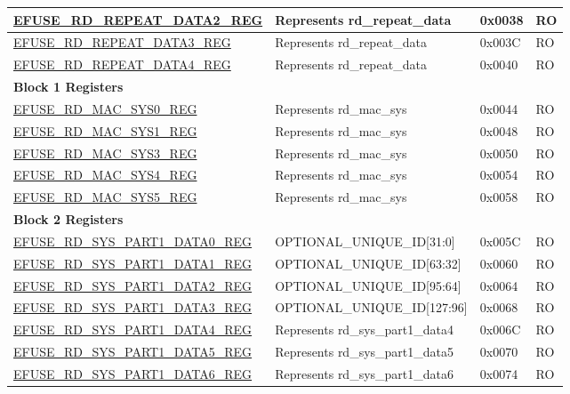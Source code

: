 \begin{longtable}{ | p{7cm} | p{6cm} | p{1.2cm} | p{1.5cm} | }
\hyperref[regdesc:EFUSERDREPEATDATA2REG]{EFUSE\_RD\_REPEAT\_DATA2\_REG} & Represents rd\_repeat\_data & 0x0038 & RO \\ \hline
\hyperref[regdesc:EFUSERDREPEATDATA3REG]{EFUSE\_RD\_REPEAT\_DATA3\_REG} & Represents rd\_repeat\_data & 0x003C & RO \\ \hline
\hyperref[regdesc:EFUSERDREPEATDATA4REG]{EFUSE\_RD\_REPEAT\_DATA4\_REG} & Represents rd\_repeat\_data & 0x0040 & RO \\ \hline
\multicolumn{4}{|l|}{\textbf{Block 1 Registers}} \\ \hline
\hyperref[regdesc:EFUSERDMACSYS0REG]{EFUSE\_RD\_MAC\_SYS0\_REG} & Represents rd\_mac\_sys & 0x0044 & RO \\ \hline
\hyperref[regdesc:EFUSERDMACSYS1REG]{EFUSE\_RD\_MAC\_SYS1\_REG} & Represents rd\_mac\_sys & 0x0048 & RO \\ \hline
\hyperref[regdesc:EFUSERDMACSYS3REG]{EFUSE\_RD\_MAC\_SYS3\_REG} & Represents rd\_mac\_sys & 0x0050 & RO \\ \hline
\hyperref[regdesc:EFUSERDMACSYS4REG]{EFUSE\_RD\_MAC\_SYS4\_REG} & Represents rd\_mac\_sys & 0x0054 & RO \\ \hline
\hyperref[regdesc:EFUSERDMACSYS5REG]{EFUSE\_RD\_MAC\_SYS5\_REG} & Represents rd\_mac\_sys & 0x0058 & RO \\ \hline
\multicolumn{4}{|l|}{\textbf{Block 2 Registers}} \\ \hline
\hyperref[regdesc:EFUSERDSYSPART1DATA0REG]{EFUSE\_RD\_SYS\_PART1\_DATA0\_REG} & OPTIONAL\_UNIQUE\_ID[31:0] & 0x005C & RO \\ \hline
\hyperref[regdesc:EFUSERDSYSPART1DATA1REG]{EFUSE\_RD\_SYS\_PART1\_DATA1\_REG} & OPTIONAL\_UNIQUE\_ID[63:32] & 0x0060 & RO \\ \hline
\hyperref[regdesc:EFUSERDSYSPART1DATA2REG]{EFUSE\_RD\_SYS\_PART1\_DATA2\_REG} & OPTIONAL\_UNIQUE\_ID[95:64] & 0x0064 & RO \\ \hline
\hyperref[regdesc:EFUSERDSYSPART1DATA3REG]{EFUSE\_RD\_SYS\_PART1\_DATA3\_REG} & OPTIONAL\_UNIQUE\_ID[127:96] & 0x0068 & RO \\ \hline
\hyperref[regdesc:EFUSERDSYSPART1DATA4TO7REG]{EFUSE\_RD\_SYS\_PART1\_DATA4\_REG} & Represents rd\_sys\_part1\_data4 & 0x006C & RO \\ \hline
\hyperref[regdesc:EFUSERDSYSPART1DATA4TO7REG]{EFUSE\_RD\_SYS\_PART1\_DATA5\_REG} & Represents rd\_sys\_part1\_data5 & 0x0070 & RO \\ \hline
\hyperref[regdesc:EFUSERDSYSPART1DATA4TO7REG]{EFUSE\_RD\_SYS\_PART1\_DATA6\_REG} & Represents rd\_sys\_part1\_data6 & 0x0074 & RO \\ \hline

\end{longtable}
